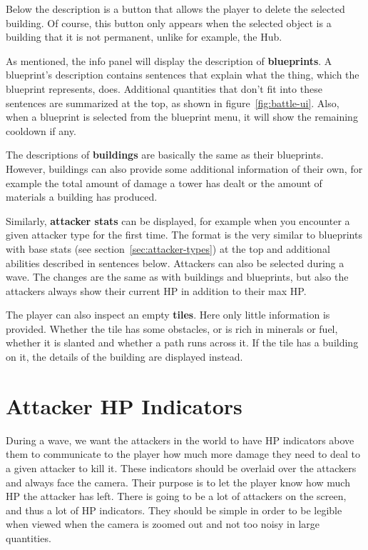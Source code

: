 Below the description is a button that allows the player to delete the selected building.
Of course, this button only appears when the selected object is a building that it is not permanent, unlike for example, the Hub.

As mentioned, the info panel will display the description of \textbf{blueprints}.
A blueprint's description contains sentences that explain what the thing, which the blueprint represents, does.
Additional quantities that don't fit into these sentences are summarized at the top, as shown in figure~\ref{fig:battle-ui}.
Also, when a blueprint is selected from the blueprint menu, it will show the remaining cooldown if any.

The descriptions of \textbf{buildings} are basically the same as their blueprints.
However, buildings can also provide some additional information of their own, for example the total amount of damage a tower has dealt or the amount of materials a building has produced.

Similarly, \textbf{attacker stats} can be displayed, for example when you encounter a given attacker type for the first time.
The format is the very similar to blueprints with base stats (see section~\ref{sec:attacker-types}) at the top and additional abilities described in sentences below.
Attackers can also be selected during a wave.
The changes are the same as with buildings and blueprints, but also the attackers always show their current HP in addition to their max HP.

The player can also inspect an empty \textbf{tiles}.
Here only little information is provided.
Whether the tile has some obstacles, or is rich in minerals or fuel, whether it is slanted and whether a path runs across it.
If the tile has a building on it, the details of the building are displayed instead.

\section{Attacker HP Indicators}

During a wave, we want the attackers in the world to have HP indicators above them to communicate to the player how much more damage they need to deal to a given attacker to kill it.
These indicators should be overlaid over the attackers and always face the camera.
Their purpose is to let the player know how much HP the attacker has left.
There is going to be a lot of attackers on the screen, and thus a lot of HP indicators.
They should be simple in order to be legible when viewed when the camera is zoomed out and not too noisy in large quantities.

